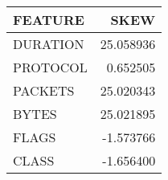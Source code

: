\begin{tabular}{lr}
\toprule
 FEATURE &      SKEW \\
\midrule
DURATION & 25.058936 \\
PROTOCOL &  0.652505 \\
 PACKETS & 25.020343 \\
   BYTES & 25.021895 \\
   FLAGS & -1.573766 \\
   CLASS & -1.656400 \\
\bottomrule
\end{tabular}
